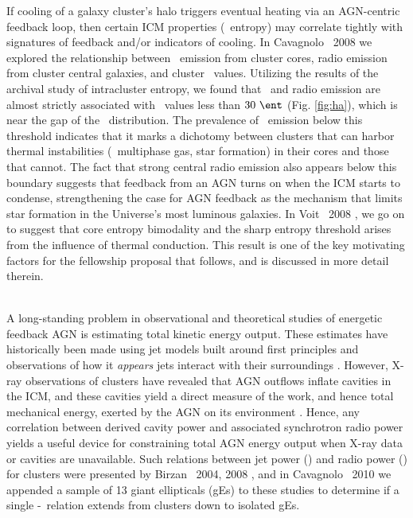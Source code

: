 \documentclass[letterpaper,12pt]{article}
\newcommand{\myhead}{Cavagnolo, Research Summary}
\begin{document}
If cooling of a galaxy cluster's halo triggers eventual heating via an
AGN-centric feedback loop, then certain ICM properties (\eg\ entropy)
may correlate tightly with signatures of feedback and/or indicators of
cooling. In Cavagnolo \etal\ 2008 \citep{haradent} we explored the
relationship between \halpha\ emission from cluster cores, radio
emission from cluster central galaxies, and cluster
\kna\ values. Utilizing the results of the archival study of
intracluster entropy, we found that \halpha\ and radio emission are
almost strictly associated with \kna\ values less than $30 ~\ent$
(Fig. \ref{fig:ha}), which is near the gap of the
\kna\ distribution. The prevalence of \halpha\ emission below this
threshold indicates that it marks a dichotomy between clusters that
can harbor thermal instabilities (\eg\ multiphase gas, star formation)
in their cores and those that cannot. The fact that strong central
radio emission also appears below this boundary suggests that feedback
from an AGN turns on when the ICM starts to condense, strengthening
the case for AGN feedback as the mechanism that limits star formation
in the Universe's most luminous galaxies. In Voit \etal\ 2008
\citep{conduction}, we go on to suggest that core entropy bimodality
and the sharp entropy threshold arises from the influence of thermal
conduction. This result is one of the key motivating factors for the
fellowship proposal that follows, and is discussed in more detail
therein.\\

\markright{\myhead}\\
 A long-standing problem in
observational and theoretical studies of energetic feedback AGN is
estimating total kinetic energy output. These estimates have
historically been made using jet models built around first principles
and observations of how it {\it{appears}} jets interact with their
surroundings \citep[\eg][]{w99}. However, X-ray observations of
clusters have revealed that AGN outflows inflate cavities in the ICM,
and these cavities yield a direct measure of the work, and hence total
mechanical energy, exerted by the AGN on its environment
\citep[see][for details]{mcnamrev}. Hence, any correlation between
derived cavity power and associated synchrotron radio power yields a
useful device for constraining total AGN energy output when X-ray data
or cavities are unavailable. Such relations between jet power (\pjet)
and radio power (\prad) for clusters were presented by Birzan
\etal\ 2004, 2008 \citep{birzan04, birzan08}, and in Cavagnolo
\etal\ 2010 \citep{pjet} we appended a sample of 13 giant ellipticals
(gEs) to these studies to determine if a single \pjet-\prad\ relation
extends from clusters down to isolated gEs.
\end{document}
